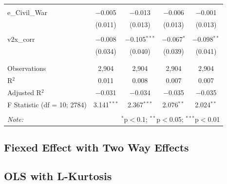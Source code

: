 \documentclass[12pt]{article}\usepackage[]{graphicx}\usepackage[]{color}
\begin{document}
\begin{table}[!htbp]
\begin{tabular}{@{\extracolsep{5pt}}lcccc}
  & & & & \\ 
 e\_Civil\_War & $-$0.005 & $-$0.013 & $-$0.006 & $-$0.001 \\ 
  & (0.011) & (0.013) & (0.013) & (0.013) \\ 
  & & & & \\ 
 v2x\_corr & $-$0.008 & $-$0.105$^{***}$ & $-$0.067$^{*}$ & $-$0.098$^{**}$ \\ 
  & (0.034) & (0.040) & (0.039) & (0.041) \\ 
  & & & & \\ 
\hline \\[-1.8ex] 
Observations & 2,904 & 2,904 & 2,904 & 2,904 \\ 
R$^{2}$ & 0.011 & 0.008 & 0.007 & 0.007 \\ 
Adjusted R$^{2}$ & $-$0.031 & $-$0.034 & $-$0.035 & $-$0.035 \\ 
F Statistic (df = 10; 2784) & 3.141$^{***}$ & 2.367$^{***}$ & 2.076$^{**}$ & 2.024$^{**}$ \\ 
\hline 
\hline \\[-1.8ex] 
\textit{Note:}  & \multicolumn{4}{r}{$^{*}$p$<$0.1; $^{**}$p$<$0.05; $^{***}$p$<$0.01} \\ 
\end{tabular} 
\end{table} 




\subsection{Fiexed Effect with Two Way Effects}


\subsection{OLS with L-Kurtosis}
\end{document}
